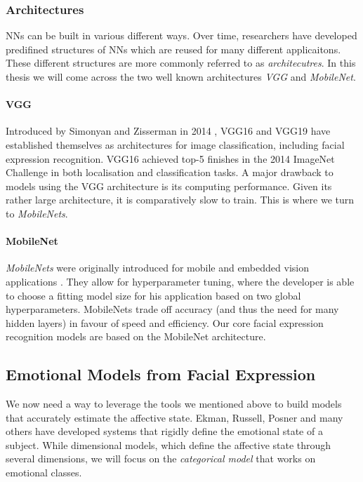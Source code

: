 \subsubsection{Architectures}
NNs can be built in various different ways. Over time, researchers have developed predifined structures of NNs which are reused for many different applicaitons. These different structures are more commonly referred to as \emph{architecutres}. In this thesis we will come across the two well known architectures \emph{VGG} and \emph{MobileNet}.
\paragraph{VGG}
Introduced by Simonyan and Zisserman in 2014 \cite{simonyan2015vgg}, VGG16 and VGG19 have established themselves as architectures for image classification, including facial expression recognition. VGG16 achieved top-5 finishes in the 2014 ImageNet Challenge in both localisation and classification tasks. A major drawback to models using the VGG architecture is its computing performance. Given its rather large architecture, it is comparatively slow to train. This is where we turn to \emph{MobileNets}.
\paragraph{MobileNet}
\emph{MobileNets} were originally introduced for mobile and embedded vision applications \cite{howard2017mobilenets}. They allow for hyperparameter tuning, where the developer is able to choose a fitting model size for his application based on two global hyperparameters. MobileNets trade off accuracy (and thus the need for many hidden layers) in favour of speed and efficiency. Our core facial expression recognition models are based on the MobileNet architecture.


\subsection{Emotional Models from Facial Expression}
\label{sub:rw_fer}
We now need a way to leverage the tools we mentioned above to build models that accurately estimate the affective state. Ekman, Russell, Posner and many others have developed systems that rigidly define the emotional state of a subject. While dimensional models, which define the affective state through several dimensions, we will focus on the \emph{categorical model} that works on emotional classes. 

